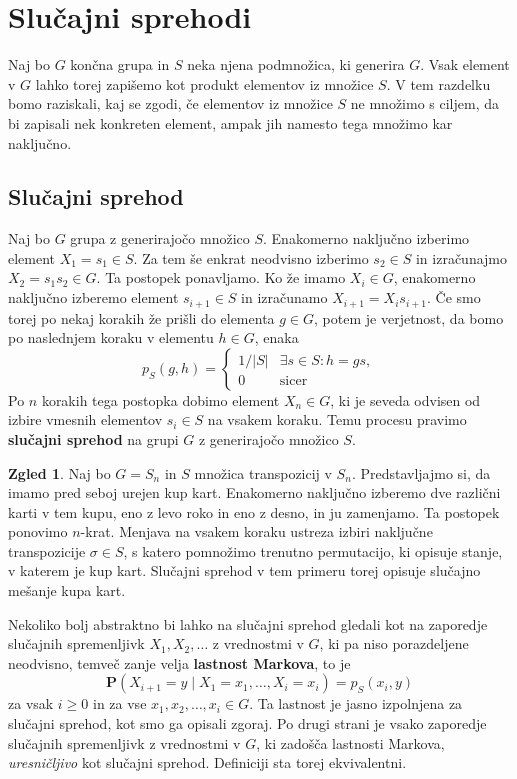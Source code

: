 \documentclass[11pt]{book}
\def\PP{\mathbf{P}}
\def\definicija{\color{rdeca}\bf}
\theoremstyle{definition}
\theoremstyle{zgled}
\newtheorem{zgled}[theorem]{Zgled}
\theoremstyle{zgledbrezstevilke}
\theoremstyle{odprtproblem}
\theoremstyle{domacanaloga}
\theoremstyle{izrek}
\begin{document}
\section{Slučajni sprehodi}

Naj bo $G$ končna grupa in $S$ neka njena podmnožica, ki generira $G$. Vsak element v $G$ lahko torej zapišemo kot produkt elementov iz množice $S$. V tem razdelku bomo raziskali, kaj se zgodi, če elementov iz množice $S$ ne množimo s ciljem, da bi zapisali nek konkreten element, ampak jih namesto tega množimo kar naključno. 

\subsection{Slučajni sprehod}

Naj bo $G$ grupa z generirajočo množico $S$. Enakomerno naključno izberimo element $X_1 = s_1 \in S$. Za tem še enkrat neodvisno izberimo $s_2 \in S$ in izračunajmo $X_2 = s_1 s_2 \in G$. Ta postopek ponavljamo. Ko že imamo $X_i \in G$, enakomerno naključno izberemo element $s_{i+1} \in S$ in izračunamo $X_{i+1} = X_i s_{i+1}$. Če smo torej po nekaj korakih že prišli do elementa $g \in G$, potem je verjetnost, da bomo po naslednjem koraku v elementu $h \in G$, enaka 
\[
p_S(g, h)
    = \begin{cases}
        1/|S| & \exists s \in S \colon h = g s, \\
        0 & \text{sicer}
    \end{cases}
\]
Po $n$ korakih tega postopka dobimo element $X_n \in G$, ki je seveda odvisen od izbire vmesnih elementov $s_i \in S$ na vsakem koraku. Temu procesu pravimo {\definicija slučajni sprehod} na grupi $G$ z generirajočo množico $S$. 


\begin{zgled}
Naj bo $G = S_n$ in $S$ množica transpozicij v $S_n$. Predstavljajmo si, da imamo pred seboj urejen kup kart. Enakomerno naključno izberemo dve različni karti v tem kupu, eno z levo roko in eno z desno, in ju zamenjamo. Ta postopek ponovimo $n$-krat. Menjava na vsakem koraku ustreza izbiri naključne transpozicije $\sigma \in S$, s katero pomnožimo trenutno permutacijo, ki opisuje stanje, v katerem je kup kart. Slučajni sprehod v tem primeru torej opisuje slučajno mešanje kupa kart.
\end{zgled}

Nekoliko bolj abstraktno bi lahko na slučajni sprehod gledali kot na zaporedje slučajnih spremenljivk $X_1, X_2, \dots$ z vrednostmi v $G$, ki pa niso porazdeljene neodvisno, temveč zanje velja {\definicija lastnost Markova}, to je
\[
    \PP( X_{i+1} = y \mid X_1 = x_1, \dots, X_i = x_i)
    = p_S(x_i, y)
\]
za vsak $i \geq 0$ in za vse $x_1, x_2, \dots, x_i \in G$. Ta lastnost je jasno izpolnjena za slučajni sprehod, kot smo ga opisali zgoraj. Po drugi strani je vsako zaporedje slučajnih spremenljivk z vrednostmi v $G$, ki zadošča lastnosti Markova, \emph{uresničljivo} kot slučajni sprehod. Definiciji sta torej ekvivalentni.
\end{document}
